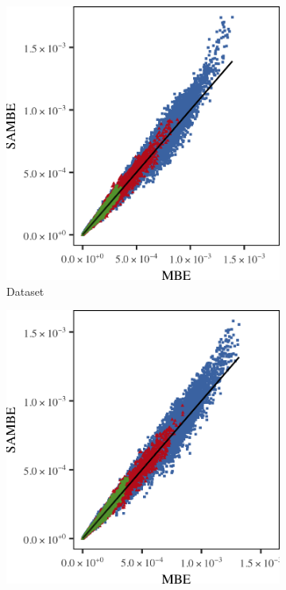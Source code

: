 	\begin{figure}
		\centering
		\begin{subfigure}{0.23\textwidth}
			\centering
			\includegraphics[keepaspectratio=true, width=\textwidth, height=0.23\textheight]{discussion/img/ferdosi_2_60000_mbe_sambe.png}
			\caption{Dataset \ferdosiTwo}
			\label{fig:discussion:multisphere:mbevssambe:ferdosi2}
		\end{subfigure}
		\begin{subfigure}{0.23\textwidth}
			\centering
			\includegraphics[keepaspectratio=true, width=\textwidth, height=0.23\textheight]{discussion/img/baakman_2_60000_mbe_sambe.png}

\end{subfigure}
\end{figure}
